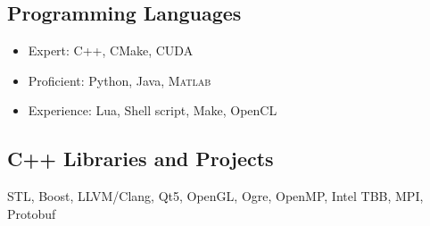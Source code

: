 \subsection{Programming Languages}
\begin{itemize}
\item Expert: C++, CMake, CUDA 
\item Proficient: Python, Java, \textsc{Matlab}
\item Experience: Lua, Shell script, Make, OpenCL 
\end{itemize}

\subsection{C++ Libraries and Projects}
STL, Boost, LLVM/Clang, Qt5, OpenGL, Ogre, OpenMP, Intel TBB, MPI, Protobuf

